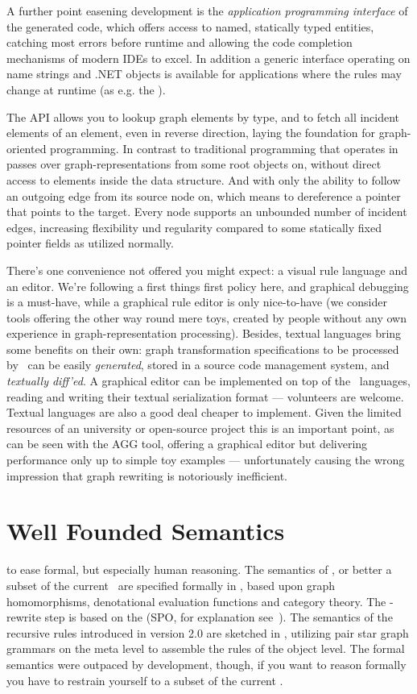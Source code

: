 A further point easening development is the \emph{application programming interface} of the generated code,
which offers access to named, statically typed entities, catching most errors before runtime and allowing the code completion mechanisms of modern IDEs to excel.
In addition a generic interface operating on name strings and .NET objects is available for applications where the rules may change at runtime (as e.g. the \GrShell).

The API allows you to lookup graph elements by type, and to fetch all incident elements of an element, even in reverse direction, laying the foundation for graph-oriented programming.
In contrast to traditional programming that operates in passes over graph-representations from some root objects on, without direct access to elements inside the data structure. 
And with only the ability to follow an outgoing edge from its source node on, which means to dereference a pointer that points to the target.
Every node supports an unbounded number of incident edges, increasing flexibility und regularity compared to some statically fixed pointer fields as utilized normally.

There's one convenience not offered you might expect: a visual rule language and an editor.
We're following a first things first policy here, and graphical debugging is a must-have, while a graphical rule editor is only nice-to-have (we consider tools offering the other way round mere toys, created by people without any own experience in graph-representation processing).%
Besides, textual languages bring some benefits on their own: graph transformation specifications to be processed by \GrG\ can be easily \emph{generated}, stored in a source code management system, and \emph{textually diff'ed}.
A graphical editor can be implemented on top of the \GrG\ languages, reading and writing their textual serialization format --- volunteers are welcome.
Textual languages are also a good deal cheaper to implement.
Given the limited resources of an university or open-source project this is an important point,
as can be seen with the AGG\cite{agg} tool, offering a graphical editor but delivering performance only up to simple toy examples
--- unfortunately causing the wrong impression that graph rewriting is notoriously inefficient.

\section{Well Founded Semantics}
to ease formal, but especially human reasoning.
The semantics of \GrG, or better a subset of the current \GrG\ are specified formally in \cite{DissRuby}, based upon graph homomorphisms, denotational evaluation functions and category theory.
The \GrG-rewrite step is based on the  (SPO, for explanation see~\cite{spoapproach}).
The semantics of the recursive rules introduced in version 2.0 are sketched in \cite{Jak:08},
utilizing pair star graph grammars on the meta level to assemble the rules of the object level.
The formal semantics were outpaced by development, though, if you want to reason formally you have to restrain yourself to a subset of the current \GrG.

